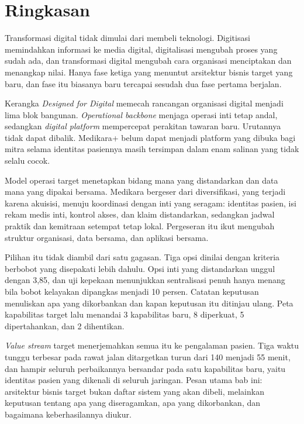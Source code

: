 \section{Ringkasan}

Transformasi digital tidak dimulai dari membeli teknologi. Digitisasi memindahkan informasi
ke media digital, digitalisasi mengubah proses yang sudah ada, dan transformasi digital
mengubah cara organisasi menciptakan dan menangkap nilai. Hanya fase ketiga yang menuntut
arsitektur bisnis target yang baru, dan fase itu biasanya baru tercapai sesudah dua fase
pertama berjalan.

Kerangka \textit{Designed for Digital} memecah rancangan organisasi digital menjadi lima
blok bangunan. \textit{Operational backbone} menjaga operasi inti tetap andal, sedangkan
\textit{digital platform} mempercepat perakitan tawaran baru. Urutannya tidak dapat dibalik.
Medikara+ belum dapat menjadi platform yang dibuka bagi mitra selama identitas pasiennya
masih tersimpan dalam enam salinan yang tidak selalu cocok.

Model operasi target menetapkan bidang mana yang distandarkan dan data mana yang dipakai
bersama. Medikara bergeser dari diversifikasi, yang terjadi karena akuisisi, menuju
koordinasi dengan inti yang seragam: identitas pasien, isi rekam medis inti, kontrol akses,
dan klaim distandarkan, sedangkan jadwal praktik dan kemitraan setempat tetap lokal.
Pergeseran itu ikut mengubah struktur organisasi, data bersama, dan aplikasi bersama.

Pilihan itu tidak diambil dari satu gagasan. Tiga opsi dinilai dengan kriteria berbobot
yang disepakati lebih dahulu. Opsi inti yang distandarkan unggul dengan 3,85, dan uji
kepekaan menunjukkan sentralisasi penuh hanya menang bila bobot kelayakan dipangkas menjadi
10 persen. Catatan keputusan menuliskan apa yang dikorbankan dan kapan keputusan itu
ditinjau ulang. Peta kapabilitas target lalu menandai 3 kapabilitas baru, 8 diperkuat, 5
dipertahankan, dan 2 dihentikan.

\textit{Value stream} target menerjemahkan semua itu ke pengalaman pasien. Tiga waktu tunggu
terbesar pada rawat jalan ditargetkan turun dari 140 menjadi 55 menit, dan hampir seluruh
perbaikannya bersandar pada satu kapabilitas baru, yaitu identitas pasien yang dikenali di
seluruh jaringan. Pesan utama bab ini: arsitektur bisnis target bukan daftar sistem yang
akan dibeli, melainkan keputusan tentang apa yang diseragamkan, apa yang dikorbankan, dan
bagaimana keberhasilannya diukur.

